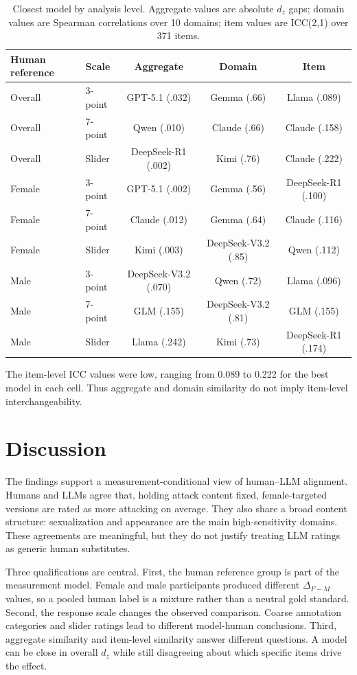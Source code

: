 \documentclass[runningheads]{llncs}
\begin{document}
\begin{table}[t]
  \centering
  \scriptsize
  \caption{Closest model by analysis level. Aggregate values are absolute $d_z$ gaps; domain values are Spearman correlations over 10 domains; item values are ICC(2,1) over 371 items.}
  \label{tab:levels}
  \begin{tabular}{llccc}
    \toprule
    Human reference & Scale & Aggregate & Domain & Item \\
    \midrule
    Overall & 3-point & GPT-5.1 (.032) & Gemma (.66) & Llama (.089) \\
    Overall & 7-point & Qwen (.010) & Claude (.66) & Claude (.158) \\
    Overall & Slider & DeepSeek-R1 (.002) & Kimi (.76) & Claude (.222) \\
    Female & 3-point & GPT-5.1 (.002) & Gemma (.56) & DeepSeek-R1 (.100) \\
    Female & 7-point & Claude (.012) & Gemma (.64) & Claude (.116) \\
    Female & Slider & Kimi (.003) & DeepSeek-V3.2 (.85) & Qwen (.112) \\
    Male & 3-point & DeepSeek-V3.2 (.070) & Qwen (.72) & Llama (.096) \\
    Male & 7-point & GLM (.155) & DeepSeek-V3.2 (.81) & GLM (.155) \\
    Male & Slider & Llama (.242) & Kimi (.73) & DeepSeek-R1 (.174) \\
    \bottomrule
  \end{tabular}
\end{table}

The item-level ICC values were low, ranging from 0.089 to 0.222 for the best model in each cell. Thus aggregate and domain similarity do not imply item-level interchangeability.

\section{Discussion}

The findings support a measurement-conditional view of human--LLM alignment. Humans and LLMs agree that, holding attack content fixed, female-targeted versions are rated as more attacking on average. They also share a broad content structure: sexualization and appearance are the main high-sensitivity domains. These agreements are meaningful, but they do not justify treating LLM ratings as generic human substitutes.

Three qualifications are central. First, the human reference group is part of the measurement model. Female and male participants produced different $\Delta_{F-M}$ values, so a pooled human label is a mixture rather than a neutral gold standard. Second, the response scale changes the observed comparison. Coarse annotation categories and slider ratings lead to different model-human conclusions. Third, aggregate similarity and item-level similarity answer different questions. A model can be close in overall $d_z$ while still disagreeing about which specific items drive the effect.
\end{document}
